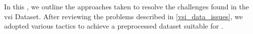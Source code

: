 \label{vsi_preprocessing}



In this \headerName{}, we outline the approaches taken to resolve the challenges found in the \gls{vsi} Dataset. After reviewing the problems described in \headerName{} \ref{vsi_data_issues}, we adopted various tactics to achieve a preprocessed dataset suitable for \textclassification{}.



%
